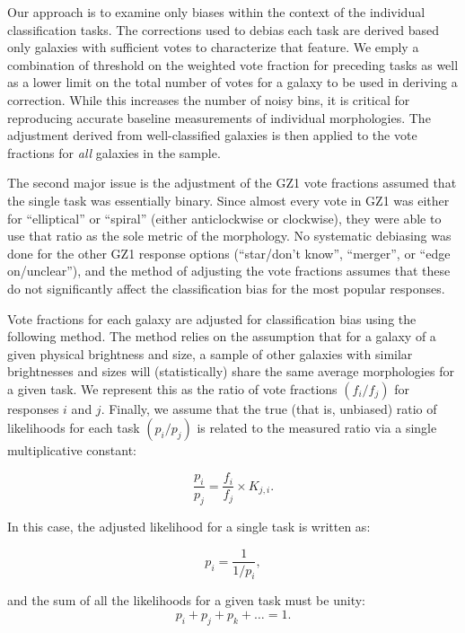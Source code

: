 \documentclass[useAMS,usenatbib]{mn2e}
\begin{document}
Our approach is to examine only biases within the context of the individual classification tasks. The corrections used to debias each task are derived based only galaxies with sufficient votes to characterize that feature. We emply a combination of threshold on the weighted vote fraction for preceding tasks as well as a lower limit on the total number of votes for a galaxy to be used in deriving a correction. While this increases the number of noisy bins, it is critical for reproducing accurate baseline measurements of individual morphologies. The adjustment derived from well-classified galaxies is then applied to the vote fractions for {\em all} galaxies in the sample. 

The second major issue is the adjustment of the GZ1 vote fractions assumed that the single task was essentially binary. Since almost every vote in GZ1 was either for ``elliptical'' or ``spiral'' (either anticlockwise or clockwise), they were able to use that ratio as the sole metric of the morphology. No systematic debiasing was done for the other GZ1 response options (``star/don't know'', ``merger'', or ``edge on/unclear''), and the method of adjusting the vote fractions assumes that these do not significantly affect the classification bias for the most popular responses. 

Vote fractions for each galaxy are adjusted for classification bias using the following method. The method relies on the assumption that for a galaxy of a given physical brightness and size, a sample of other galaxies with similar brightnesses and sizes will (statistically) share the same average morphologies for a given task. We represent this as the ratio of vote fractions $(f_i/f_j)$ for responses $i$ and $j$. Finally, we assume that the true (that is, unbiased) ratio of likelihoods for each task $(p_i/p_j)$ is related to the measured ratio via a single multiplicative constant:

\begin{equation}
\frac{p_i}{p_j} = \frac{f_i}{f_j}\times K_{j,i}.
\label{eqn-kdef}
\end{equation}

\noindent In this case, the adjusted likelihood for a single task is written as:

\begin{equation}
p_i = \frac{1}{1/p_i},
\label{eqn-adjprob1}
\end{equation}

\noindent and the sum of all the likelihoods for a given task must be unity:
\begin{equation}
p_i + p_j + p_k + \dots = 1.
\label{eqn-sumprob}
\end{equation}
\end{document}
